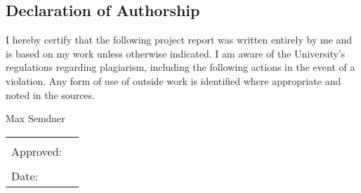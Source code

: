 \begin{center}
\section*{Declaration of Authorship}
\end{center}

\noindent I hereby certify that the following project report was written entirely by me and is based on my work unless otherwise indicated. I am aware of the University's regulations regarding plagiarism, including the following actions in the event of a violation. Any form of use of outside work is identified where appropriate and noted in the sources.

\vspace{1cm}

\begin{center}
\large
Max Semdner
\end{center}

\begin{tabular}{p{5cm}p{10cm}}
& \\
Approved: & \hrulefill \\
& \\
Date: & \hrulefill \\
\end{tabular}